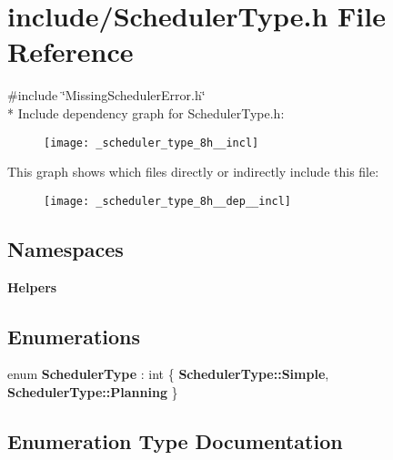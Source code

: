 \section{include/\+Scheduler\+Type.h File Reference}
\label{_scheduler_type_8h}
{\ttfamily \#include \char`\"{}Missing\+Scheduler\+Error.\+h\char`\"{}}\\*
Include dependency graph for Scheduler\+Type.\+h\+:
\nopagebreak
\begin{figure}[H]
\begin{center}
\leavevmode
\texttt{[image: \_scheduler\_type\_8h\_\_incl]}
\end{center}
\end{figure}
This graph shows which files directly or indirectly include this file\+:
\nopagebreak
\begin{figure}[H]
\begin{center}
\leavevmode
\texttt{[image: \_scheduler\_type\_8h\_\_dep\_\_incl]}
\end{center}
\end{figure}
\subsection*{Namespaces}
\begin{DoxyCompactItemize}
\item 
 {\bf Helpers}
\end{DoxyCompactItemize}
\subsection*{Enumerations}
\begin{DoxyCompactItemize}
\item 
enum {\bf Scheduler\+Type} \+: int \{ {\bf Scheduler\+Type\+::\+Simple}, 
{\bf Scheduler\+Type\+::\+Planning}
 \}
\end{DoxyCompactItemize}


\subsection{Enumeration Type Documentation}
